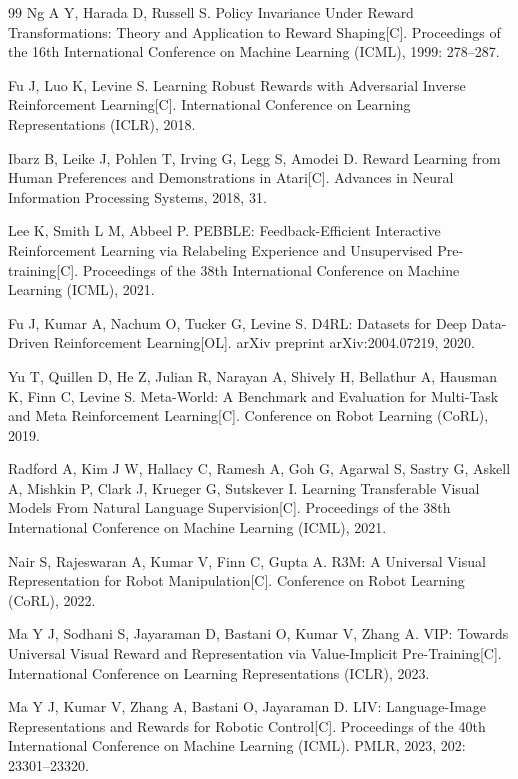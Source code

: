 \begin{thebibliography}{99}
    Ng A Y, Harada D, Russell S.
    Policy Invariance Under Reward Transformations: Theory and Application to Reward Shaping[C].
    Proceedings of the 16th International Conference on Machine Learning (ICML), 1999: 278--287.
    
    Fu J, Luo K, Levine S.
    Learning Robust Rewards with Adversarial Inverse Reinforcement Learning[C].
    International Conference on Learning Representations (ICLR), 2018.
    
    Ibarz B, Leike J, Pohlen T, Irving G, Legg S, Amodei D.
    Reward Learning from Human Preferences and Demonstrations in Atari[C].
    Advances in Neural Information Processing Systems, 2018, 31.
    
    Lee K, Smith L M, Abbeel P.
    PEBBLE: Feedback-Efficient Interactive Reinforcement Learning via Relabeling Experience and Unsupervised Pre-training[C].
    Proceedings of the 38th International Conference on Machine Learning (ICML), 2021.
    
    Fu J, Kumar A, Nachum O, Tucker G, Levine S.
    D4RL: Datasets for Deep Data-Driven Reinforcement Learning[OL].
    arXiv preprint arXiv:2004.07219, 2020.
    
    Yu T, Quillen D, He Z, Julian R, Narayan A, Shively H, Bellathur A, Hausman K, Finn C, Levine S.
    Meta-World: A Benchmark and Evaluation for Multi-Task and Meta Reinforcement Learning[C].
    Conference on Robot Learning (CoRL), 2019.
    
    Radford A, Kim J W, Hallacy C, Ramesh A, Goh G, Agarwal S, Sastry G, Askell A, Mishkin P, Clark J, Krueger G, Sutskever I.
    Learning Transferable Visual Models From Natural Language Supervision[C].
    Proceedings of the 38th International Conference on Machine Learning (ICML), 2021.
    
    Nair S, Rajeswaran A, Kumar V, Finn C, Gupta A.
    R3M: A Universal Visual Representation for Robot Manipulation[C].
    Conference on Robot Learning (CoRL), 2022.
    
    Ma Y J, Sodhani S, Jayaraman D, Bastani O, Kumar V, Zhang A.
    VIP: Towards Universal Visual Reward and Representation via Value-Implicit Pre-Training[C].
    International Conference on Learning Representations (ICLR), 2023.
    
    Ma Y J, Kumar V, Zhang A, Bastani O, Jayaraman D.
    LIV: Language-Image Representations and Rewards for Robotic Control[C].
    Proceedings of the 40th International Conference on Machine Learning (ICML). PMLR, 2023, 202: 23301--23320.
    

\end{thebibliography}
